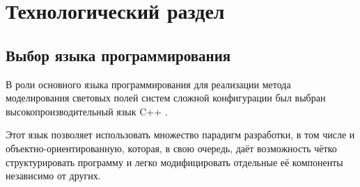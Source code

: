 
\chapter{Технологический раздел}

\section{Выбор языка программирования}

В роли основного языка программирования для реализации метода моделирования световых полей систем сложной конфигурации был выбран высокопроизводительный язык C++ \cite{cpp}.

Этот язык позволяет использовать множество парадигм разработки, в том числе и объектно-ориентированную, которая, в свою очередь, даёт возможность чётко структурировать программу и легко модифицировать отдельные её компоненты независимо от других.


